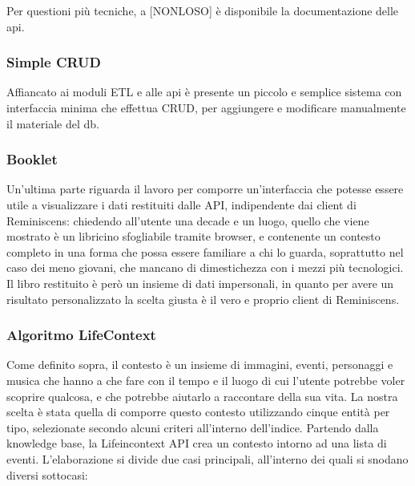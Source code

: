 \documentclass[sigproc-sp.tex]{subfiles}
\begin{document}
Per questioni più tecniche, a [NONLOSO] è disponibile la documentazione delle api.

\subsubsection{Simple CRUD}
Affiancato ai moduli ETL e alle api è presente un piccolo e semplice sistema con interfaccia minima che effettua CRUD, per aggiungere e modificare manualmente il materiale del db.

\subsubsection{Booklet}
\label{subsubsec:booklet}
Un’ultima parte riguarda il lavoro per comporre un’interfaccia che potesse essere utile a visualizzare i dati restituiti dalle API, indipendente dai client di Reminiscens: chiedendo all’utente una decade e un luogo, quello che viene mostrato è un libricino sfogliabile tramite browser, e contenente un contesto completo in una forma che possa essere familiare a chi lo guarda, soprattutto nel caso dei meno giovani, che mancano di dimestichezza con i mezzi più tecnologici. Il libro restituito è però un insieme di dati impersonali, in quanto per avere un risultato personalizzato la scelta giusta è il vero e proprio client di Reminiscens.

\subsubsection{Algoritmo LifeContext}
\label{subsubsec:lifecontext}
Come definito sopra, il contesto è un insieme di immagini, eventi, personaggi e musica che hanno a che fare con il tempo e il luogo di cui l’utente potrebbe voler scoprire qualcosa, e che potrebbe aiutarlo a raccontare della sua vita. La nostra scelta è stata quella di comporre questo contesto utilizzando cinque entità per tipo, selezionate secondo alcuni criteri all’interno dell’indice.
Partendo dalla knowledge base, la Lifeincontext API crea un contesto intorno ad una lista di eventi. L’elaborazione si divide due casi principali, all’interno dei quali si snodano diversi sottocasi:
\end{document}
